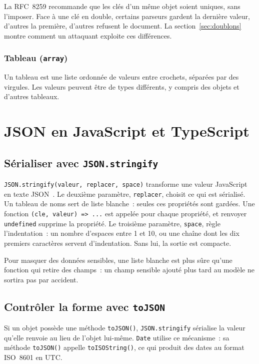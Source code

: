 \documentclass[12pt,a4paper]{article}
\newcommand{\exemple}[3][]{%
  \par\addvspace{6pt}\noindent\begin{minipage}{\linewidth}%
  \end{minipage}\par\addvspace{6pt}}
\begin{document}
La RFC~8259 recommande que les clés d'un même objet soient uniques, sans l'imposer. Face à une clé en double, certains parseurs gardent la dernière valeur, d'autres la première, d'autres refusent le document. La section~\ref{sec:doublons} montre comment un attaquant exploite ces différences.

\subsubsection{Tableau (\texttt{array})}
Un tableau est une liste ordonnée de valeurs entre crochets, séparées par des virgules. Les valeurs peuvent être de types différents, y compris des objets et d'autres tableaux.


\section{JSON en JavaScript et TypeScript}
\label{sec:js}

\subsection{Sérialiser avec \texttt{JSON.stringify}}
\texttt{JSON.stringify(valeur, replacer, space)} transforme une valeur JavaScript en texte JSON~\cite{ecma262}. Le deuxième paramètre, \texttt{replacer}, choisit ce qui est sérialisé. Un tableau de noms sert de liste blanche~: seules ces propriétés sont gardées. Une fonction \texttt{(cle, valeur) => ...} est appelée pour chaque propriété, et renvoyer \texttt{undefined} supprime la propriété. Le troisième paramètre, \texttt{space}, règle l'indentation~: un nombre d'espaces entre 1 et 10, ou une chaîne dont les dix premiers caractères servent d'indentation. Sans lui, la sortie est compacte.

\exemple[language=javascript]{js/01_replacer.mjs}{Liste blanche, fonction \texttt{replacer} et indentation}

Pour masquer des données sensibles, une liste blanche est plus sûre qu'une fonction qui retire des champs~: un champ sensible ajouté plus tard au modèle ne sortira pas par accident.

\subsection{Contrôler la forme avec \texttt{toJSON}}
Si un objet possède une méthode \texttt{toJSON()}, \texttt{JSON.stringify} sérialise la valeur qu'elle renvoie au lieu de l'objet lui-même. \texttt{Date} utilise ce mécanisme~: sa méthode \texttt{toJSON()} appelle \texttt{toISOString()}, ce qui produit des dates au format ISO~8601 en UTC.
\end{document}
